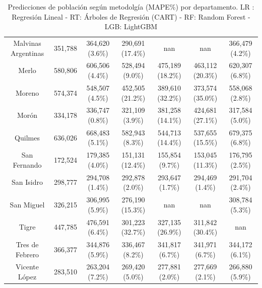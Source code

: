 \documentclass{article}
\theoremstyle{mytheoremstyle}
\theoremstyle{mytheoremstyle}
\theoremstyle{myproblemstyle}
\begin{document}
\begin{table}[htb]
\begin{tabular}{|c|c|c|c|c|c|c|}
  Malvinas Argentinas & 351,788 & 364,620 (3.6\%) & 290,691 (17.4\%) & nan & nan & 366,479 (4.2\%) \\
  Merlo & 580,806 & 606,506 (4.4\%) & 528,494 (9.0\%) & 475,189 (18.2\%) & 463,112 (20.3\%) & 620,307 (6.8\%) \\
  Moreno & 574,374 & 548,507 (4.5\%) & 452,505 (21.2\%) & 389,610 (32.2\%) & 373,574 (35.0\%) & 558,068 (2.8\%) \\
  Morón & 334,178 & 336,747 (0.8\%) & 321,109 (3.9\%) & 381,258 (14.1\%) & 424,681 (27.1\%) & 317,584 (5.0\%) \\
  Quilmes & 636,026 & 668,483 (5.1\%) & 582,943 (8.3\%) & 544,713 (14.4\%) & 537,655 (15.5\%) & 679,375 (6.8\%) \\
  San Fernando & 172,524 & 179,385 (4.0\%) & 151,131 (12.4\%) & 155,854 (9.7\%) & 153,045 (11.3\%) & 176,795 (2.5\%) \\
  San Isidro & 298,777 & 294,708 (1.4\%) & 292,878 (2.0\%) & 293,647 (1.7\%) & 294,469 (1.4\%) & 291,704 (2.4\%) \\
  San Miguel & 326,215 & 306,995 (5.9\%) & 276,190 (15.3\%) & nan & nan & 308,784 (5.3\%) \\
  Tigre & 447,785 & 476,591 (6.4\%) & 301,223 (32.7\%) & 327,135 (26.9\%) & 311,842 (30.4\%) & nan \\
  Tres de Febrero & 366,377 & 344,876 (5.9\%) & 336,467 (8.2\%) & 341,817 (6.7\%) & 341,971 (6.7\%) & 344,172 (6.1\%) \\
  Vicente López & 283,510 & 263,204 (7.2\%) & 269,420 (5.0\%) & 277,881 (2.0\%) & 277,669 (2.1\%) & 266,880 (5.9\%) \\
  \hline
  \end{tabular}
  \caption{Predicciones de población según metodolgía (MAPE\%) por departamento.\newline
          LR : Regresión Lineal - RT: Árboles de Regresión (CART) - RF: Random Forest - LGB: LightGBM}
  \label{tab:PredAndMape}
  \end{table}
  
\end{document}
